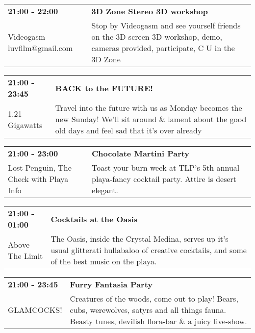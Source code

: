 \begin{tabular}{ p{1in} p{2.2in} }
    \textbf{21:00 - 22:00} & \textbf{3D Zone Stereo 3D workshop } \\
    Videogasm \newline luvfilm@gmail.com & Stop by Videogasm and see yourself friends on the 3D screen  3D workshop, demo, cameras provided, participate, C U in the 3D Zone \\
    \hline 
\end{tabular}
    
\begin{tabular}{ p{1in} p{2.2in} }
    \textbf{21:00 - 23:45} & \textbf{BACK to the FUTURE!} \\
    1.21 Gigawatts \newline  & Travel into the future with us as Monday becomes the new Sunday! We'll sit around \& lament about the good old days and feel sad that it's over already \\
    \hline 
\end{tabular}
    
\begin{tabular}{ p{1in} p{2.2in} }
    \textbf{21:00 - 23:00} & \textbf{Chocolate Martini Party} \\
    Lost Penguin, The \newline  Check with Playa Info & Toast your burn week at TLP's 5th annual playa-fancy cocktail party. Attire is desert elegant. \\
    \hline 
\end{tabular}
    
\begin{tabular}{ p{1in} p{2.2in} }
    \textbf{21:00 - 01:00} & \textbf{Cocktails at the Oasis} \\
    Above The Limit \newline  & The Oasis, inside the Crystal Medina, serves up it's usual glitterati hullabaloo of creative cocktails, and some of the best music on the playa. \\
    \hline 
\end{tabular}
    
\begin{tabular}{ p{1in} p{2.2in} }
    \textbf{21:00 - 23:45} & \textbf{Furry Fantasia Party } \\
    GLAMCOCKS! \newline  & Creatures of the woods, come out to play! Bears, cubs, werewolves, satyrs and all things fauna. Beasty tunes, devilish flora-bar \& a juicy live-show. \\
    \hline 
\end{tabular}
    
